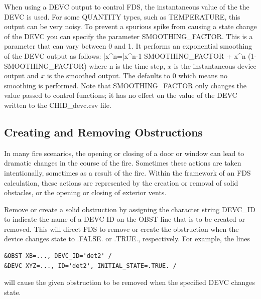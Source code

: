 \documentclass[11pt]{book}
\begin{document}
When using a {\ct DEVC} output to control FDS, the instantaneous value of the the {\ct DEVC} is used.  For some {\ct QUANTITY} types, such as {\ct TEMPERATURE}, this output can be very noisy.  To prevent a spurious spike from causing a state change of the {\ct DEVC} you can specify the parameter {\ct SMOOTHING\_FACTOR}.  This is a parameter that can vary between 0 and 1.  It performs an exponential smoothing of the {\ct DEVC} output as follows:
\be
\bar{x}^n=\bar{x}^{n-1} \; \mbox{\ct SMOOTHING\_FACTOR} + x^n \; (1-\mbox{\ct SMOOTHING\_FACTOR})
\ee
where n is the time step, $x$ is the instantaneous device output and $\bar{x}$ is the smoothed output.  The  defaults to 0 which means no smoothing is performed.  Note that {\ct SMOOTHING\_FACTOR} only changes the value passed to control functions; it has no effect on the value of the {\ct DEVC} written to the {\ct CHID\_devc.csv} file.

\subsection{Creating and Removing Obstructions}
\label{info:create_remove}

In many fire scenarios, the opening or closing of a door or window can lead to dramatic changes in the course of the fire. Sometimes these actions are taken intentionally, sometimes as a result of the fire. Within the framework of an FDS calculation, these actions are represented by the creation or removal of solid obstacles, or the opening or closing of exterior vents.

Remove or create a solid obstruction by assigning the character string {\ct DEVC\_ID} to indicate the name of a {\ct DEVC} {\ct ID} on the {\ct OBST} line that is to be created or removed.  This will direct FDS to remove or create the obstruction when the device changes state to {\ct .FALSE.} or {\ct .TRUE.}, respectively. For example, the lines
\begin{lstlisting}
&OBST XB=..., DEVC_ID='det2' /
&DEVC XYZ=..., ID='det2', INITIAL_STATE=.TRUE. /
\end{lstlisting}
will cause the given obstruction to be removed when the specified {\ct DEVC} changes state.
\end{document}
